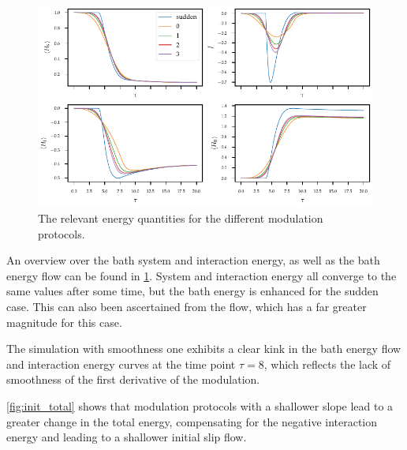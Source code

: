 \begin{figure}[htp]
  \centering
  \includegraphics{figs/one_bath_mod/init_overview}
  \caption{\label{fig:init_energies}The relevant energy quantities for
    the different modulation protocols.}
\end{figure}
An overview over the bath system and interaction energy, as well as
the bath energy flow can be found in \cref{fig:init_energies}. System
and interaction energy all converge to the same values after some
time, but the bath energy is enhanced for the sudden case. This can
also been ascertained from the flow, which has a far greater magnitude
for this case.

The simulation with smoothness one exhibits a clear kink in the bath
energy flow and interaction energy curves at the time point \(τ=8\),
which reflects the lack of smoothness of the first derivative of the
modulation.

\cref{fig:init_total} shows that modulation protocols with a shallower
slope lead to a greater change in the total energy, compensating for
the negative interaction energy and leading to a shallower initial
slip flow.

